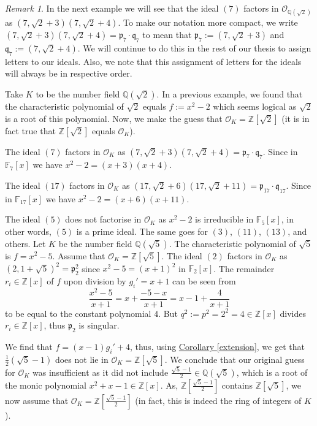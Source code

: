 \documentclass[openany, a4paper, 10pt]{book}
\theoremstyle{plain}
\theoremstyle{plain}
\theoremstyle{plain}
\theoremstyle{definition}
\theoremstyle{plain}
\theoremstyle{definition}
\theoremstyle{remark}
\newtheorem*{remark}{Remark}
\newcommand{\corref}[1]{\hyperref[#1]{Corollary \ref{#1}}}
\begin{document}
\begin{remark}
    In the next example we will see that the ideal $(7)$ factors in $\mathcal O_{\mathbb Q(\sqrt{2})}$ as $(7, \sqrt{2}+3)(7, \sqrt{2}+4)$.
    To make our notation more compact, we write $(7, \sqrt{2}+3)(7, \sqrt{2}+4) = \mathfrak p_7 \cdot \mathfrak q_7$ to mean that $\mathfrak p_7 := (7, \sqrt{2}+3)$ and $\mathfrak q_7 := (7, \sqrt{2}+4)$.
    We will continue to do this in the rest of our thesis to assign letters to our ideals.
    Also, we note that this assignment of letters for the ideals will always be in respective order.
\end{remark}

\begin{examplebox}
    Take $K$ to be the number field $\mathbb Q(\sqrt{2})$.
    In a previous example, we found that the characteristic polynomial of $\sqrt{2}$ equals $f:=x^2-2$ which seems logical as $\sqrt{2}$ is a root of this polynomial.
    Now, we make the guess that $\mathcal O_K = \mathbb Z[\sqrt{2}]$ (it is in fact true that $\mathbb Z[\sqrt{2}]$ equals $\mathcal O_K$).

    The ideal $(7)$ factors in $\mathcal O_K$ as
    $(7, \sqrt{2}+3)(7, \sqrt{2}+4) = \mathfrak p_7 \cdot \mathfrak q_7$.
    Since in $\mathbb F_7[x]$ we have $x^2-2 = (x+3)(x+4)$.

    The ideal $(17)$ factors in $\mathcal O_K$ as
    $(17, \sqrt{2}+6)(17, \sqrt{2}+11) = \mathfrak p_{17} \cdot \mathfrak q_{17}$.
    Since in $\mathbb F_{17}[x]$ we have $x^2-2 = (x+6)(x+11)$.

    The ideal $(5)$ does not factorise in $\mathcal O_K$ as $x^2-2$ is irreducible in $\mathbb F_5[x]$, in other words, $(5)$ is a prime ideal.
    The same goes for $(3)$, $(11)$, $(13)$, and others.
    \tcbline
    Let $K$ be the number field $\mathbb Q(\sqrt{5})$.
    The characteristic polynomial of $\sqrt{5}$ is $f=x^2-5$.
    Assume that $\mathcal O_K = \mathbb Z[\sqrt{5}]$.
    The ideal $(2)$ factors in $\mathcal O_K$ as $(2, 1+\sqrt{5})^2 = \mathfrak p_2^2$ since $x^2-5 = (x+1)^2$ in $\mathbb F_2[x]$.
    The remainder $r_i \in \mathbb Z[x]$ of $f$ upon division by $g_i' = x+1$
    can be seen from
    $$\frac{x^2-5}{x+1} = x + \frac{-5-x}{x+1} = x - 1 + \frac{4}{x+1}$$
    to be equal to the constant polynomial $4$.
    But $q^2 := p^2 = 2^2 = 4 \in \mathbb Z[x]$ divides $r_i \in \mathbb Z[x]$, thus $\mathfrak p_2$ is singular.

    We find that $f = (x-1)g_i' + 4$, thus, using \corref{extension}, we get that $\frac{1}{2}(\sqrt{5}-1)$ does not lie in $\mathcal O_K = \mathbb Z[\sqrt{5}]$.
    We conclude that our original guess for $\mathcal O_K$ was insufficient as it did not include $\frac{\sqrt{5}-1}{2} \in \mathbb Q(\sqrt{5})$, which is a root of the monic polynomial $x^2+x-1 \in \mathbb Z[x]$.
    As, $\mathbb Z[\frac{\sqrt{5}-1}{2}]$ contains $\mathbb Z[\sqrt{5}]$, we now assume that $\mathcal O_K = \mathbb Z[\frac{\sqrt{5}-1}{2}]$ (in fact, this is indeed the ring of integers of $K$).


\end{examplebox}
\end{document}
